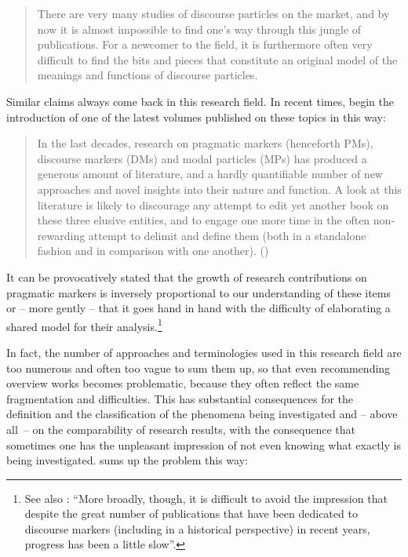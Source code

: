\begin{quote}
There are very many studies of discourse particles on the market, and by now it is almost impossible to find one’s way through this jungle of publications. For a newcomer to the field, it is furthermore often very difficult to find the bits and pieces that constitute an original model of the meanings and functions of discourse particles. \citep[1]{Fischer2006}
\end{quote}

Similar claims always come back in this research field. In recent times, \citet{FedrianiSansò2017} begin the introduction of one of the latest volumes published on these topics in this way:

\begin{quote}
In the last decades, research on pragmatic markers (henceforth PMs), discourse markers (DMs) and modal particles (MPs) has produced a generous amount of literature, and a hardly quantifiable number of new approaches and novel insights into their nature and function. A look at this literature is likely to discourage any attempt to edit yet another book on these three elusive entities, and to engage one more time in the often non-rewarding attempt to delimit and define them (both in a standalone fashion and in comparison with one another). (\citealt[1]{FedrianiSansò2017})
\end{quote}

It can be provocatively stated that the growth of research contributions on pragmatic markers is inversely proportional to our understanding of these items or – more gently – that it goes hand in hand with the difficulty of elaborating a shared model for their analysis.\footnote{See also \citet[75]{Waltereit2015}: “More broadly, though, it is difficult to avoid the impression that despite the great number of publications that have been dedicated to discourse markers (including in a historical perspective) in recent years, progress has been a little slow”.}

In fact, the number of approaches and terminologies used in this research field are too numerous and often too vague to sum them up, so that even recommending overview works becomes problematic, because they often reflect the same fragmentation and difficulties. This has substantial consequences for the definition and the classification of the phenomena being investigated and – above all~– on the comparability of research results, with the consequence that sometimes one has the unpleasant impression of not even knowing what exactly is being investigated. \citet{Schourup1999} sums up the problem this way:

